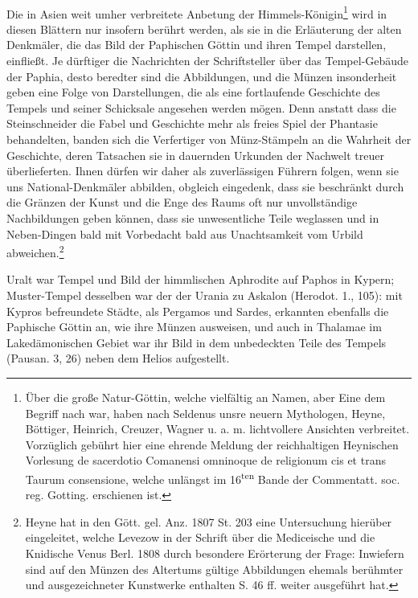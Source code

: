 \documentclass[a4paper, 11pt, oneside, polutonikogreek, german]{article}
\begin{document}
\paragraph{}
Die in Asien weit umher verbreitete Anbetung der Himmels-Königin\footnote{Über die große Natur-Göttin, welche vielfältig an Namen, aber Eine dem Begriff nach war, haben nach Seldenus unsre neuern Mythologen, Heyne, Böttiger, Heinrich, Creuzer, Wagner u. a. m. lichtvollere Ansichten verbreitet. Vorzüglich gebührt hier eine ehrende Meldung der reichhaltigen Heynischen Vorlesung de sacerdotio Comanensi omninoque de religionum cis et trans Taurum consensione, welche unlängst im 16\textsuperscript{ten} Bande der Commentatt. soc. reg. Gotting. erschienen ist.} wird in diesen Blättern nur insofern berührt werden, als sie in die Erläuterung der alten Denkmäler, die das Bild der Paphischen Göttin und ihren Tempel darstellen, einfließt. Je dürftiger die Nachrichten der Schriftsteller über das Tempel-Gebäude der Paphia, desto beredter sind die Abbildungen, und die Münzen insonderheit geben eine Folge von Darstellungen, die als eine fortlaufende Geschichte des Tempels und seiner Schicksale angesehen werden mögen. Denn anstatt dass die Steinschneider die Fabel und Geschichte mehr als freies Spiel der Phantasie behandelten, banden sich die Verfertiger von Münz-Stämpeln an die Wahrheit der Geschichte, deren Tatsachen sie in dauernden Urkunden der Nachwelt treuer überlieferten. Ihnen dürfen wir daher als zuverlässigen Führern folgen, wenn sie uns National-Denkmäler abbilden, obgleich eingedenk, dass sie beschränkt durch die Gränzen der Kunst und die Enge des Raums oft nur unvollständige Nachbildungen geben können, dass sie unwesentliche Teile weglassen und in Neben-Dingen bald mit Vorbedacht bald aus Unachtsamkeit vom Urbild abweichen.\footnote{Heyne hat in den Gött. gel. Anz. 1807 St. 203 eine Untersuchung hierüber eingeleitet, welche Levezow in der Schrift über die Mediceische und die Knidische Venus Berl. 1808 durch besondere Erörterung der Frage: Inwiefern sind auf den Münzen des Altertums gültige Abbildungen ehemals berühmter und ausgezeichneter Kunstwerke enthalten S. 46 ff. weiter ausgeführt hat.}

Uralt war Tempel und Bild der himmlischen Aphrodite auf Paphos in Kypern; Muster-Tempel desselben war der der Urania zu Askalon (Herodot. 1., 105): mit Kypros befreundete Städte, als Pergamos und Sardes, erkannten ebenfalls die Paphische Göttin an, wie ihre Münzen ausweisen, und auch in Thalamae im Lakedämonischen Gebiet war ihr Bild in dem unbedeckten Teile des Tempels (Pausan. 3, 26) neben dem Helios aufgestellt.
\end{document}
